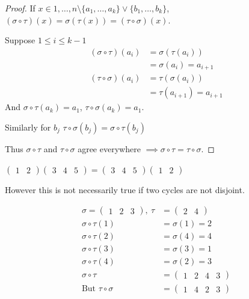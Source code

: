 \begin{proof}
If \(x \in {1, \ldots, n} \setminus \{ a_1, \ldots, a_k \} \lor \{ b_1, \ldots, b_k \}\), \((\sigma \circ \tau) (x) = \sigma \left( \tau(x) \right) = (\tau \circ \sigma)(x)\).

Suppose \(1 \leq i \leq k - 1\)
\begin{align*}
    (\sigma \circ \tau)(a_i) &= \sigma\left(\tau(a_i) \right) \\
    &= \sigma(a_i) = a_{i + 1} \\
    (\tau \circ \sigma)(a_i) &= \tau\left(\sigma(a_i) \right) \\
    &= \tau(a_{i + 1}) = a_{i + 1}
\end{align*}
And \(\sigma \circ \tau (a_k) = a_1\), \(\tau \circ \sigma (a_k) = a_1\).

Similarly for \(b_j\)
\(\tau \circ \sigma (b_j) = \sigma \circ \tau (b_j)\)

Thus \(\sigma \circ \tau\) and \(\tau \circ \sigma\) agree everywhere \(\implies \sigma \circ \tau = \tau \circ \sigma\).
\end{proof}

\begin{example}
\(\begin{pmatrix}1 & 2\end{pmatrix} \begin{pmatrix}3 & 4 & 5\end{pmatrix} = \begin{pmatrix}3 & 4 & 5\end{pmatrix} \begin{pmatrix}1 & 2\end{pmatrix}\)
\end{example}

However this is not necessarily true if two cycles are not disjoint.

\begin{example}
\begin{align*}
    \sigma = \begin{pmatrix}1 & 2 & 3\end{pmatrix},\ \tau &= \begin{pmatrix}2 & 4\end{pmatrix} \\
    \sigma \circ \tau(1) &= \sigma(1) = 2 \\
    \sigma \circ \tau(2) &= \sigma(4) = 4 \\
    \sigma \circ \tau(3) &= \sigma(3) = 1 \\
    \sigma \circ \tau(4) &= \sigma(2) = 3 \\
    \sigma \circ \tau &= \begin{pmatrix}1 & 2 & 4 & 3\end{pmatrix} \\
    \text{But } \tau \circ \sigma &= \begin{pmatrix} 1 & 4 & 2 & 3 \end{pmatrix}
\end{align*}
\end{example}


